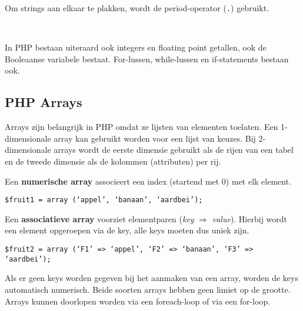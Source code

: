 Om strings aan elkaar te plakken, wordt de period-operator (\texttt{.}) gebruikt.

~

\noindent In PHP bestaan uiteraard ook integers en floating point getallen, ook de Booleaanse variabele bestaat. For-lussen, while-lussen en if-statements bestaan ook.


\subsection{PHP Arrays}
Arrays zijn belangrijk in PHP omdat ze lijsten van elementen toelaten. Een 1-dimensionale array kan gebruikt worden voor een lijst van keuzes. Bij 2-dimensionale arrays wordt de eerste dimensie gebruikt als de rijen van een tabel en de tweede dimensie als de kolommen (attributen) per rij.

Een \textbf{numerische array} associeert een index (startend met 0) met elk element.

\vspace{1mm}\hspace{10mm}
\texttt{\$fruit1 = array (`appel', `banaan', `aardbei');}
\vspace{3mm}

\noindent Een \textbf{associatieve array} voorziet elementparen (\textit{key} $\Rightarrow$ \textit{value}). Hierbij wordt een element opgeroepen via de key, alle keys moeten dus uniek zijn.

\vspace{1mm}\hspace{10mm}
\texttt{\$fruit2 = array (`F1' => `appel', `F2' => `banaan', `F3' => `aardbei');}
\vspace{3mm}

\noindent Als er geen keys worden gegeven bij het aanmaken van een array, worden de keys automatisch numerisch. Beide soorten arrays hebben geen limiet op de grootte. Arrays kunnen doorlopen worden via een foreach-loop of via een for-loop.




